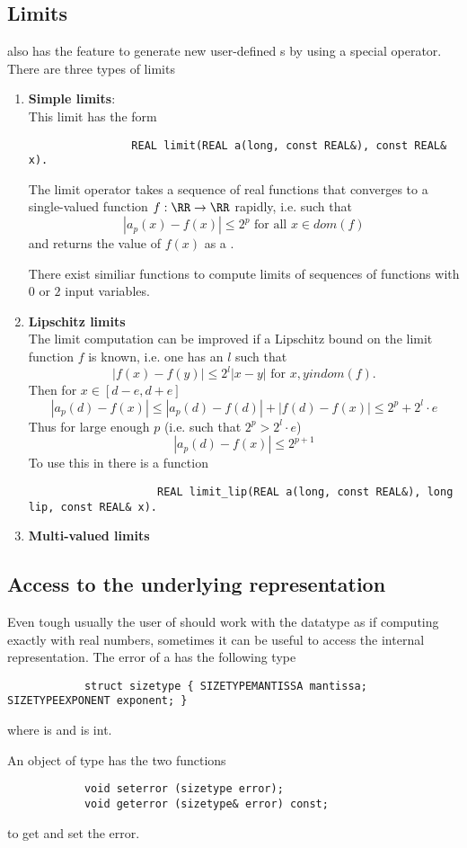 	\subsection{Limits}
		\irram also has the feature to generate new user-defined {\real}s by using a special  operator.
		There are three types of limits
		\begin{enumerate}
			\item \textbf{Simple limits}: \\
			This limit has the form
			\begin{verbatim}
				REAL limit(REAL a(long, const REAL&), const REAL& x).
			\end{verbatim}

			The limit operator takes a sequence of real functions that converges to a single-valued function $f: \RR \to \RR$
			rapidly, i.e. such that 
			$$|a_p(x) - f(x)| \leq 2^p \text{ for all } x \in dom(f)$$
			and returns the value of $f(x)$ as a \real.

			There exist similiar functions to compute limits of sequences of functions with $0$ or $2$ input variables.
			\item \textbf{Lipschitz limits} \\
				The limit computation can be improved if a Lipschitz bound on the limit function $f$ is known, i.e. one has an $l$
				such that
				\begin{equation*}
					| f(x) - f(y) | \leq 2^l | x - y | \text{ for } x,y in dom(f).
				\end{equation*}
				Then for $x \in [d-e, d+e]$  
				$$ | a_p(d) - f(x) | \leq | a_p(d) - f(d) | + | f(d) - f(x) |  \leq 2^p + 2^l \cdot e $$
				Thus for large enough $p$ (i.e. such that $2^p > 2^l \cdot e$)
				$$ | a_p(d) - f(x) | \leq  2^{p+1} $$
				To use this in \irram there is a function
				\begin{verbatim}
					REAL limit_lip(REAL a(long, const REAL&), long lip, const REAL& x).
				\end{verbatim}
			\item \textbf{Multi-valued limits}
		\end{enumerate}
	\subsection{Access to the underlying representation}
		Even tough usually the user of \irram should work with the datatype \real
		as if computing exactly with real numbers, sometimes it can be useful to access the internal representation.
		The error of a \real has the following type
		\begin{verbatim}
			struct sizetype { SIZETYPEMANTISSA mantissa; SIZETYPEEXPONENT exponent; }
		\end{verbatim}
		where  is  and  is int.
		
		An object of type \real has the two functions
		\begin{verbatim}
			void seterror (sizetype error);
			void geterror (sizetype& error) const;
		\end{verbatim}
		to get and set the error.